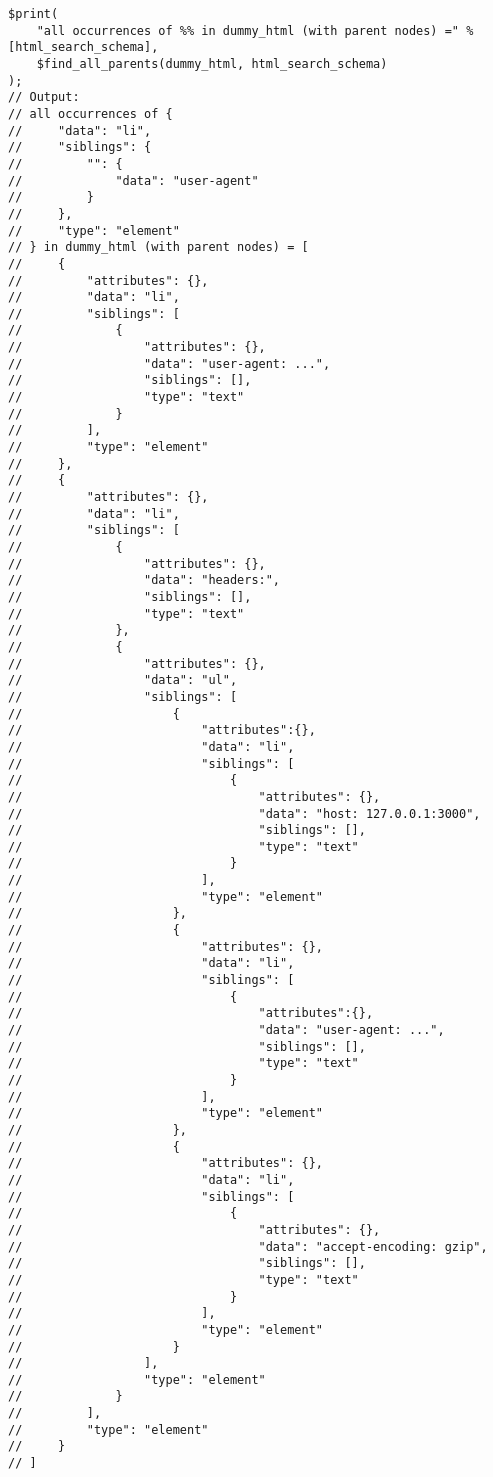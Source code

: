\begin{center}
\begin{verbatim}
$print(
    "all occurrences of %% in dummy_html (with parent nodes) =" % [html_search_schema],
    $find_all_parents(dummy_html, html_search_schema)
);
// Output:
// all occurrences of {
//     "data": "li",
//     "siblings": {
//         "": {
//             "data": "user-agent"
//         }
//     },
//     "type": "element"
// } in dummy_html (with parent nodes) = [
//     {
//         "attributes": {},
//         "data": "li",
//         "siblings": [
//             {
//                 "attributes": {},
//                 "data": "user-agent: ...",
//                 "siblings": [],
//                 "type": "text"
//             }
//         ],
//         "type": "element"
//     },
//     {
//         "attributes": {},
//         "data": "li",
//         "siblings": [
//             {
//                 "attributes": {},
//                 "data": "headers:",
//                 "siblings": [],
//                 "type": "text"
//             },
//             {
//                 "attributes": {},
//                 "data": "ul",
//                 "siblings": [
//                     {
//                         "attributes":{},
//                         "data": "li",
//                         "siblings": [
//                             {
//                                 "attributes": {},
//                                 "data": "host: 127.0.0.1:3000",
//                                 "siblings": [],
//                                 "type": "text"
//                             }
//                         ],
//                         "type": "element"
//                     },
//                     {
//                         "attributes": {},
//                         "data": "li",
//                         "siblings": [
//                             {
//                                 "attributes":{},
//                                 "data": "user-agent: ...",
//                                 "siblings": [],
//                                 "type": "text"
//                             }
//                         ],
//                         "type": "element"
//                     },
//                     {
//                         "attributes": {},
//                         "data": "li",
//                         "siblings": [
//                             {
//                                 "attributes": {},
//                                 "data": "accept-encoding: gzip",
//                                 "siblings": [],
//                                 "type": "text"
//                             }
//                         ],
//                         "type": "element"
//                     }
//                 ],
//                 "type": "element"
//             }
//         ],
//         "type": "element"
//     }
// ]
\end{verbatim}
\end{center}


